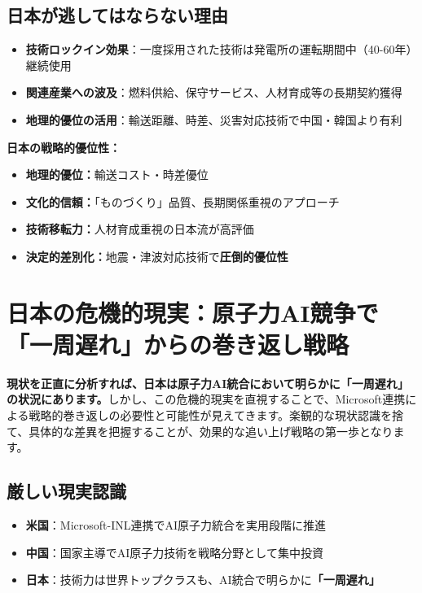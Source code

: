 \documentclass[10pt,a4paper]{jsarticle}
\begin{document}
\subsection{日本が逃してはならない理由}
\begin{itemize}
    \item \textbf{技術ロックイン効果}：一度採用された技術は発電所の運転期間中（40-60年）継続使用
    \item \textbf{関連産業への波及}：燃料供給、保守サービス、人材育成等の長期契約獲得
    \item \textbf{地理的優位の活用}：輸送距離、時差、災害対応技術で中国・韓国より有利
\end{itemize}

\textbf{日本の戦略的優位性：}
\begin{itemize}
    \item \textbf{地理的優位：}輸送コスト・時差優位
    \item \textbf{文化的信頼：}「ものづくり」品質、長期関係重視のアプローチ
    \item \textbf{技術移転力：}人材育成重視の日本流が高評価
    \item \textbf{決定的差別化：}地震・津波対応技術で\textbf{圧倒的優位性}
\end{itemize}

\section{日本の危機的現実：原子力AI競争で「一周遅れ」からの巻き返し戦略}

\textbf{現状を正直に分析すれば、日本は原子力AI統合において明らかに「一周遅れ」の状況にあります。}しかし、この危機的現実を直視することで、Microsoft連携による戦略的巻き返しの必要性と可能性が見えてきます。楽観的な現状認識を捨て、具体的な差異を把握することが、効果的な追い上げ戦略の第一歩となります。

\subsection{厳しい現実認識}
\begin{itemize}
    \item \textbf{米国}：Microsoft-INL連携でAI原子力統合を実用段階に推進
    \item \textbf{中国}：国家主導でAI原子力技術を戦略分野として集中投資
    \item \textbf{日本}：技術力は世界トップクラスも、AI統合で明らかに\textbf{「一周遅れ」}
\end{itemize}
\end{document}
